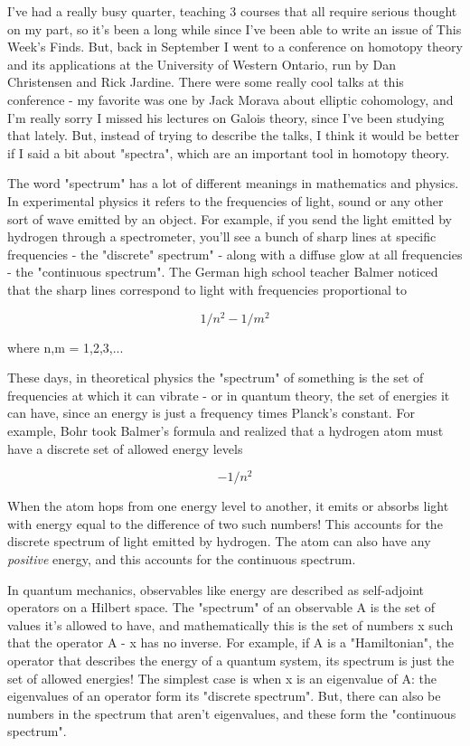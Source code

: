 



I've had a really busy quarter, teaching 3 courses that all require
serious thought on my part, so it's been a long while since I've been
able to write an issue of This Week's Finds.  But, back in September 
I went to a conference on homotopy theory and its applications at the
University of Western Ontario, run by Dan Christensen and Rick
Jardine.  There were some really cool talks at this conference - my
favorite was one by Jack Morava about elliptic cohomology, and I'm
really sorry I missed his lectures on Galois theory, since I've been
studying that lately.  But, instead of trying to describe the talks, 
I think it would be better if I said a bit about "spectra", 
which are an important tool in homotopy theory.

The word "spectrum" has a lot of different meanings in mathematics 
and physics.  In experimental physics it refers to the frequencies of
light, sound or any other sort of wave emitted by an object.  For
example, if you send the light emitted by hydrogen through a
spectrometer, you'll see a bunch of sharp lines at specific
frequencies - the "discrete" spectrum" - along with a diffuse glow at
all frequencies - the "continuous spectrum".  The German high school
teacher Balmer noticed that the sharp lines correspond to light with
frequencies proportional to


$$

1/n^{2} - 1/m^{2}
$$
    
where n,m = 1,2,3,...  

These days, in theoretical physics the "spectrum" of something is the
set of frequencies at which it can vibrate - or in quantum theory, the
set of energies it can have, since an energy is just a frequency times
Planck's constant.  For example, Bohr took Balmer's formula and
realized that a hydrogen atom must have a discrete set of allowed
energy levels


$$

-1/n^{2}
$$
    

When the atom hops from one energy level to another, it emits or
absorbs light with energy equal to the difference of two such numbers!
This accounts for the discrete spectrum of light emitted by hydrogen.
The atom can also have any \emph{positive} energy, and this accounts for
the continuous spectrum.

In quantum mechanics, observables like energy are described as
self-adjoint operators on a Hilbert space.  The "spectrum" of an
observable A is the set of values it's allowed to have, and
mathematically this is the set of numbers x such that the operator A - x 
has no inverse.  For example, if A is a "Hamiltonian", the operator
that describes the energy of a quantum system, its spectrum is just
the set of allowed energies!  The simplest case is when x is an
eigenvalue of A: the eigenvalues of an operator form its "discrete
spectrum".  But, there can also be numbers in the spectrum that aren't
eigenvalues, and these form the "continuous spectrum".


